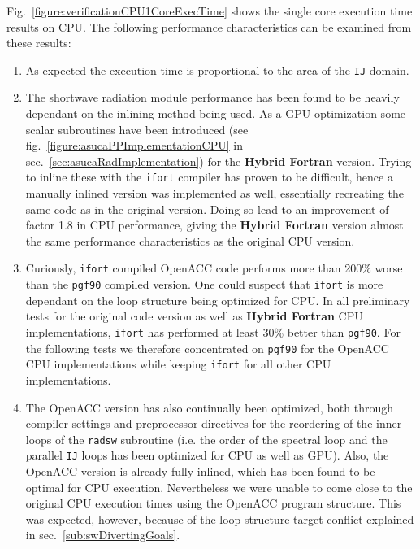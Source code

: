 Fig.~\ref{figure:verificationCPU1CoreExecTime} shows the single core execution time results on CPU. The following performance characteristics can be examined from these results:
\begin{enumerate}
 \item As expected the execution time is proportional to the area of the \verb|IJ| domain.
 \item The shortwave radiation module performance has been found to be heavily dependant on the inlining method being used. As a GPU optimization some scalar subroutines have been introduced (see fig.~\ref{figure:asucaPPImplementationCPU} in sec.~\ref{sec:asucaRadImplementation}) for the \textbf{Hybrid Fortran} version. Trying to inline these with the \verb|ifort| compiler has proven to be difficult, hence a manually inlined version was implemented as well, essentially recreating the same code as in the original version. Doing so lead to an improvement of factor 1.8 in CPU performance, giving the \textbf{Hybrid Fortran} version almost the same performance characteristics as the original CPU version.
 \item Curiously, \verb|ifort| compiled OpenACC code performs more than 200\% worse than the \verb|pgf90| compiled version. One could suspect that \verb|ifort| is more dependant on the loop structure being optimized for CPU. In all preliminary tests for the original code version as well as \textbf{Hybrid Fortran} CPU implementations, \verb|ifort| has performed at least 30\% better than \verb|pgf90|. For the following tests we therefore concentrated on \verb|pgf90| for the OpenACC CPU implementations while keeping \verb|ifort| for all other CPU implementations.
 \item The OpenACC version has also continually been optimized, both through compiler settings and preprocessor directives for the reordering of the inner loops of the \verb|radsw| subroutine (i.e. the order of the spectral loop and the parallel \verb|IJ| loops has been optimized for CPU as well as GPU). Also, the OpenACC version is already fully inlined, which has been found to be optimal for CPU execution. Nevertheless we were unable to come close to the original CPU execution times using the OpenACC program structure. This was expected, however, because of the loop structure target conflict explained in sec.~\ref{sub:swDivertingGoals}.
\end{enumerate}

